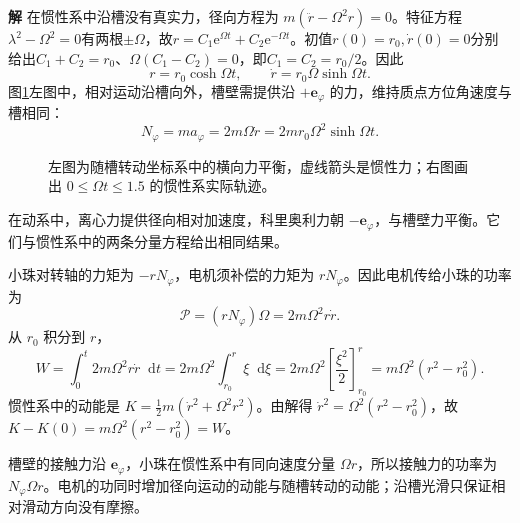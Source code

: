 \documentclass[11pt,openany,fontset=fandol]{ctexbook}
\theoremstyle{definition}\newtheorem{example}{例}[chapter]\newtheorem{exercise}{习题}[chapter]
\newcommand{\SolutionStart}{\par\medskip\ifdim\pagetotal>0pt\ifdim\dimexpr\pagegoal-\pagetotal\relax<3\baselineskip\newpage\fi\fi\noindent\textbf{解}\quad\ignorespaces}
\newenvironment{solution}{\SolutionStart}{\par\medskip}
\newcommand{\dd}{\mathop{}\!\mathrm d}\newcommand{\ee}{\mathrm e}\newcommand{\vct}[1]{\bm{#1}}
\begin{document}
\begin{solution}
在惯性系中沿槽没有真实力，径向方程为
$m(\ddot r-\Omega^2r)=0$。特征方程$\lambda^2-\Omega^2=0$有两根$\pm\Omega$，故$r=C_1\ee^{\Omega t}+C_2\ee^{-\Omega t}$。初值$r(0)=r_0,\dot r(0)=0$分别给出$C_1+C_2=r_0$、$\Omega(C_1-C_2)=0$，即$C_1=C_2=r_0/2$。因此
\[
r=r_0\cosh\Omega t,\qquad \dot r=r_0\Omega\sinh\Omega t.
\]
图\ref{mp3:fig:l3-e10-s}左图中，相对运动沿槽向外，槽壁需提供沿 $+\vct e_\varphi$ 的力，维持质点方位角速度与槽相同：
\[
N_\varphi=m a_\varphi=2m\Omega\dot r
=2mr_0\Omega^2\sinh\Omega t.
\]

\begin{figure}[H]\centering
{}
\caption{左图为随槽转动坐标系中的横向力平衡，虚线箭头是惯性力；右图画出 $0\le\Omega t\le1.5$ 的惯性系实际轨迹。}\label{mp3:fig:l3-e10-s}
\end{figure}


在动系中，离心力提供径向相对加速度，科里奥利力朝 $-\vct e_\varphi$，与槽壁力平衡。它们与惯性系中的两条分量方程给出相同结果。

小珠对转轴的力矩为 $-rN_\varphi$，电机须补偿的力矩为 $rN_\varphi$。因此电机传给小珠的功率为
\[
\mathcal P=(rN_\varphi)\Omega
=2m\Omega^2r\dot r.
\]
从 $r_0$ 积分到 $r$，
\[
W=\int_0^t2m\Omega^2r\dot r\dd t
=2m\Omega^2\int_{r_0}^r\xi\dd\xi
=2m\Omega^2\left[\frac{\xi^2}{2}\right]_{r_0}^r
=m\Omega^2(r^2-r_0^2).
\]
惯性系中的动能是 $K=\tfrac12m(\dot r^2+\Omega^2r^2)$。由解得
$\dot r^2=\Omega^2(r^2-r_0^2)$，故
$K-K(0)=m\Omega^2(r^2-r_0^2)=W$。

槽壁的接触力沿 $\vct e_\varphi$，小珠在惯性系中有同向速度分量 $\Omega r$，所以接触力的功率为 $N_\varphi\Omega r$。电机的功同时增加径向运动的动能与随槽转动的动能；沿槽光滑只保证相对滑动方向没有摩擦。

\end{solution}
\end{document}
